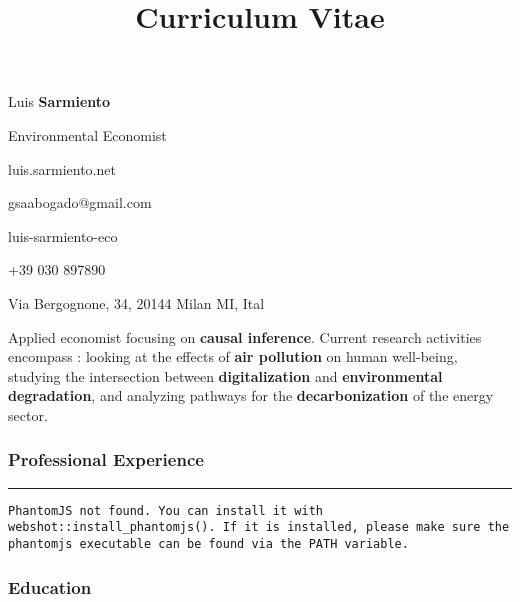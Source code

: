 \documentclass[
  0.8em,
  letterpaper,
  DIV=11,
  numbers=noendperiod]{scrartcl}
\title{Curriculum Vitae}
\author{}
\date{}
\renewcommand*\contentsname{Table of contents}
\newcommand\contentsname{Table of contents}
\begin{document}
\maketitle
\ifdefined\Shaded\renewenvironment{Shaded}{\begin{tcolorbox}[interior hidden, sharp corners, enhanced, boxrule=0pt, borderline west={3pt}{0pt}{shadecolor}, breakable, frame hidden]}{\end{tcolorbox}}\fi

\renewcommand*\contentsname{Table of contents}
{
\hypersetup{linkcolor=}
\setcounter{tocdepth}{3}
\tableofcontents
}
Luis \textbf{Sarmiento}

Environmental Economist

 luis.sarmiento.net

 gsaabogado@gmail.com

 luis-sarmiento-eco

 +39 030 897890

 Via Bergognone, 34, 20144 Milan MI, Ital

Applied economist focusing on \textbf{causal inference}. Current
research activities encompass : looking at the effects of \textbf{air
pollution} on human well-being, studying the intersection between
\textbf{digitalization} and \textbf{environmental degradation}, and
analyzing pathways for the \textbf{decarbonization} of the energy
sector.

\hypertarget{fa-briefcase-professional-experience}{%
\subsubsection{\texorpdfstring{ Professional
Experience}{ Professional Experience}}\label{fa-briefcase-professional-experience}}

\begin{center}\rule{0.5\linewidth}{0.5pt}\end{center}

\begin{verbatim}
PhantomJS not found. You can install it with webshot::install_phantomjs(). If it is installed, please make sure the phantomjs executable can be found via the PATH variable.
\end{verbatim}

\hypertarget{fa-building-columns-education}{%
\subsubsection{\texorpdfstring{
Education}{ Education}}\label{fa-building-columns-education}}
\end{document}
